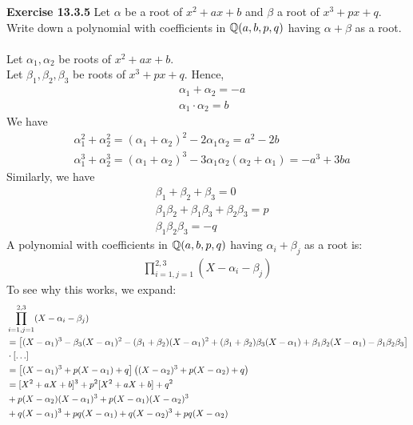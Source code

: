 \documentclass{article}
\begin{document}
\begin{homeworkProblem}
\textbf{Exercise 13.3.5} Let $\alpha$ be a root of $x^2 + ax + b$ and $\beta$ a root of $x^3 + px + q$. 
Write down a polynomial with coefficients in $\mathbb{Q}(a,b,p,q)$ having $\alpha + \beta$ as a root.\\
\solution \\

Let $\alpha_1, \alpha_2$ be roots of $x^2 + ax + b$.\\
Let $\beta_1, \beta_2, \beta_3$ be roots of $x^3 + px + q$. Hence, 
\begin{align}
    & \alpha_1 + \alpha_2 = -a\\
    & \alpha_1 \cdot \alpha_2 = b
\end{align}
We have 
\begin{align}
    & \alpha_1^2 + \alpha_2^2 = (\alpha_1+\alpha_2)^2 - 2 \alpha_1 \alpha_2 = a^2 - 2 b\\
    & \alpha_1^3 + \alpha_2^3 = (\alpha_1+\alpha_2)^3 - 3 \alpha_1 \alpha_2 (\alpha_2 + \alpha_1) = - a^3 + 3 b a
\end{align}
Similarly, we have 
\begin{align}
    & \beta_1 + \beta_2 + \beta_3 = 0\\
    & \beta_1 \beta_2 + \beta_1 \beta_3 + \beta_2 \beta_3 = p\\
    & \beta_1 \beta_2 \beta_3 = -q
\end{align}
A polynomial with coefficients in $\mathbb{Q} (a,b,p,q)$ having $\alpha_i + \beta_j$ as a root is:
\begin{align}
    \prod_{i=1, j=1}^{2,3} (X-\alpha_i - \beta_j)
\end{align}
To see why this works, we expand:
\begin{align}
    & \prod_{i=1, j=1}^{2,3} (X-\alpha_i - \beta_j)\\
    & = \bigb{(X-\alpha_1)^3 - \beta_3(X- \alpha_1)^2 - (\beta_1 + \beta_2)(X- \alpha_1)^2 + (\beta_1 + \beta_2)\beta_3 (X - \alpha_1) + \beta_1 \beta_2 (X - \alpha_1) - \beta_1 \beta_2 \beta_3 } \\
    & \cdot \bigb{\ldots}\\
    & = \bigb{(X-\alpha_1)^3 + p (X-\alpha_1) + q} \bigp{(X-\alpha_2)^3 + p(X-\alpha_2) + q} \\
    & = [X^2 + aX + b]^3 + p^2 [ X^2 + aX + b] + q^2\\
    & + p(X-\alpha_2)(X-\alpha_1)^3 + p(X-\alpha_1)(X-\alpha_2)^3\\
    & + q(X-\alpha_1)^3 + pq (X-\alpha_1) + q (X-\alpha_2)^3 + pq (X - \alpha_2)

\end{align}
\end{homeworkProblem}
\end{document}
